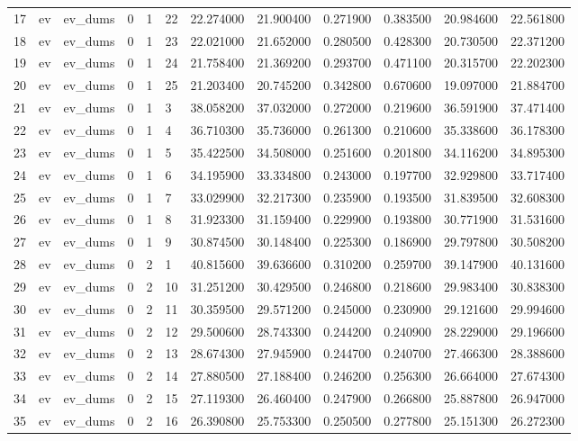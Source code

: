 \begin{tabular}{llllllrrrrrr}
17 & ev & ev_dums & 0 & 1 & 22 & 22.274000 & 21.900400 & 0.271900 & 0.383500 & 20.984600 & 22.561800 \\
18 & ev & ev_dums & 0 & 1 & 23 & 22.021000 & 21.652000 & 0.280500 & 0.428300 & 20.730500 & 22.371200 \\
19 & ev & ev_dums & 0 & 1 & 24 & 21.758400 & 21.369200 & 0.293700 & 0.471100 & 20.315700 & 22.202300 \\
20 & ev & ev_dums & 0 & 1 & 25 & 21.203400 & 20.745200 & 0.342800 & 0.670600 & 19.097000 & 21.884700 \\
21 & ev & ev_dums & 0 & 1 & 3 & 38.058200 & 37.032000 & 0.272000 & 0.219600 & 36.591900 & 37.471400 \\
22 & ev & ev_dums & 0 & 1 & 4 & 36.710300 & 35.736000 & 0.261300 & 0.210600 & 35.338600 & 36.178300 \\
23 & ev & ev_dums & 0 & 1 & 5 & 35.422500 & 34.508000 & 0.251600 & 0.201800 & 34.116200 & 34.895300 \\
24 & ev & ev_dums & 0 & 1 & 6 & 34.195900 & 33.334800 & 0.243000 & 0.197700 & 32.929800 & 33.717400 \\
25 & ev & ev_dums & 0 & 1 & 7 & 33.029900 & 32.217300 & 0.235900 & 0.193500 & 31.839500 & 32.608300 \\
26 & ev & ev_dums & 0 & 1 & 8 & 31.923300 & 31.159400 & 0.229900 & 0.193800 & 30.771900 & 31.531600 \\
27 & ev & ev_dums & 0 & 1 & 9 & 30.874500 & 30.148400 & 0.225300 & 0.186900 & 29.797800 & 30.508200 \\
28 & ev & ev_dums & 0 & 2 & 1 & 40.815600 & 39.636600 & 0.310200 & 0.259700 & 39.147900 & 40.131600 \\
29 & ev & ev_dums & 0 & 2 & 10 & 31.251200 & 30.429500 & 0.246800 & 0.218600 & 29.983400 & 30.838300 \\
30 & ev & ev_dums & 0 & 2 & 11 & 30.359500 & 29.571200 & 0.245000 & 0.230900 & 29.121600 & 29.994600 \\
31 & ev & ev_dums & 0 & 2 & 12 & 29.500600 & 28.743300 & 0.244200 & 0.240900 & 28.229000 & 29.196600 \\
32 & ev & ev_dums & 0 & 2 & 13 & 28.674300 & 27.945900 & 0.244700 & 0.240700 & 27.466300 & 28.388600 \\
33 & ev & ev_dums & 0 & 2 & 14 & 27.880500 & 27.188400 & 0.246200 & 0.256300 & 26.664000 & 27.674300 \\
34 & ev & ev_dums & 0 & 2 & 15 & 27.119300 & 26.460400 & 0.247900 & 0.266800 & 25.887800 & 26.947000 \\
35 & ev & ev_dums & 0 & 2 & 16 & 26.390800 & 25.753300 & 0.250500 & 0.277800 & 25.151300 & 26.272300 \\

\end{tabular}
